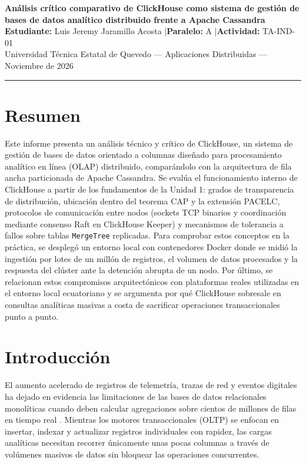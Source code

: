\documentclass[12pt,a4paper]{article}
\begin{document}
\begin{center}
    {\Large \textbf{Análisis crítico comparativo de ClickHouse como sistema de gestión de bases de datos analítico distribuido frente a Apache Cassandra}}\\[0.35cm]
    {\normalsize \textbf{Estudiante:} Luis Jeremy Jaramillo Acosta \quad|\quad \textbf{Paralelo:} A \quad|\quad \textbf{Actividad:} TA-IND-01}\\[0.15cm]
    {\small Universidad Técnica Estatal de Quevedo — Aplicaciones Distribuidas — Noviembre de 2026}
\end{center}
\vspace{0.3cm}
\hrule
\vspace{0.4cm}
\justifying

\section*{Resumen}
Este informe presenta un análisis técnico y crítico de ClickHouse, un sistema de gestión de bases de datos orientado a columnas diseñado para procesamiento analítico en línea (OLAP) distribuido, comparándolo con la arquitectura de fila ancha particionada de Apache Cassandra. Se evalúa el funcionamiento interno de ClickHouse a partir de los fundamentos de la Unidad 1: grados de transparencia de distribución, ubicación dentro del teorema CAP y la extensión PACELC, protocolos de comunicación entre nodos (sockets TCP binarios y coordinación mediante consenso Raft en ClickHouse Keeper) y mecanismos de tolerancia a fallos sobre tablas \texttt{MergeTree} replicadas. Para comprobar estos conceptos en la práctica, se desplegó un entorno local con contenedores Docker donde se midió la ingestión por lotes de un millón de registros, el volumen de datos procesados y la respuesta del clúster ante la detención abrupta de un nodo. Por último, se relacionan estos compromisos arquitectónicos con plataformas reales utilizadas en el entorno local ecuatoriano y se argumenta por qué ClickHouse sobresale en consultas analíticas masivas a costa de sacrificar operaciones transaccionales punto a punto.

\newpage

\section{Introducción}
El aumento acelerado de registros de telemetría, trazas de red y eventos digitales ha dejado en evidencia las limitaciones de las bases de datos relacionales monolíticas cuando deben calcular agregaciones sobre cientos de millones de filas en tiempo real \cite{habib2024architecture}. Mientras los motores transaccionales (OLTP) se enfocan en insertar, indexar y actualizar registros individuales con rapidez, las cargas analíticas necesitan recorrer únicamente unas pocas columnas a través de volúmenes masivos de datos sin bloquear las operaciones concurrentes.
\end{document}
